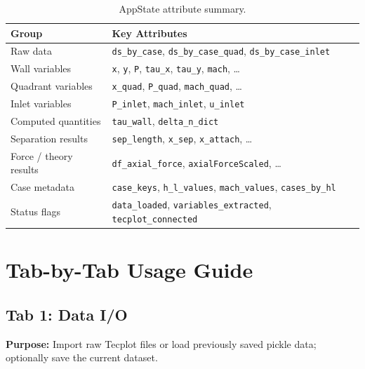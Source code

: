 \documentclass[11pt,letterpaper]{article}
\begin{document}
\begin{table}[h]
\centering
\small
\begin{tabular}{ll}
\toprule
\textbf{Group}         & \textbf{Key Attributes} \\
\midrule
Raw data               & \texttt{ds\_by\_case}, \texttt{ds\_by\_case\_quad}, \texttt{ds\_by\_case\_inlet} \\
Wall variables         & \texttt{x}, \texttt{y}, \texttt{P}, \texttt{tau\_x}, \texttt{tau\_y}, \texttt{mach}, \ldots \\
Quadrant variables     & \texttt{x\_quad}, \texttt{P\_quad}, \texttt{mach\_quad}, \ldots \\
Inlet variables        & \texttt{P\_inlet}, \texttt{mach\_inlet}, \texttt{u\_inlet} \\
Computed quantities    & \texttt{tau\_wall}, \texttt{delta\_n\_dict} \\
Separation results     & \texttt{sep\_length}, \texttt{x\_sep}, \texttt{x\_attach}, \ldots \\
Force / theory results & \texttt{df\_axial\_force}, \texttt{axialForceScaled}, \ldots \\
Case metadata          & \texttt{case\_keys}, \texttt{h\_l\_values}, \texttt{mach\_values}, \texttt{cases\_by\_hl} \\
Status flags           & \texttt{data\_loaded}, \texttt{variables\_extracted}, \texttt{tecplot\_connected} \\
\bottomrule
\end{tabular}
\caption{AppState attribute summary.}
\end{table}

\section{Tab-by-Tab Usage Guide}

\subsection{Tab 1: Data I/O}

\textbf{Purpose:} Import raw Tecplot files or load previously saved pickle
data; optionally save the current dataset.
\end{document}
